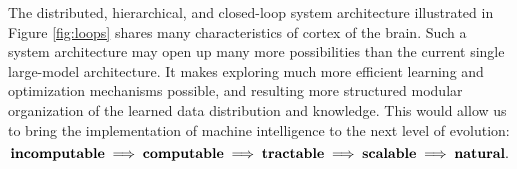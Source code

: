 \documentclass[\toplevelprefix/book-main.tex]{subfiles}
\begin{document}
The distributed, hierarchical, and closed-loop system architecture illustrated in Figure \ref{fig:loops} shares many characteristics of cortex of the brain. Such a system architecture may open up many more possibilities than the current single large-model architecture. It makes exploring much more efficient learning and optimization mechanisms possible, and resulting more structured modular organization of the learned data distribution and knowledge. This would allow us to bring the implementation of machine intelligence to the next level of evolution: 
\begin{equation}
   \mbox{\textbf{incomputable}} \;
   \Longrightarrow \; \mbox{\textbf{computable}} \;
   \Longrightarrow \; \mbox{\textbf{tractable}} \; \Longrightarrow \; 
   \mbox{\textbf{scalable}} \; \Longrightarrow \; 
   \mbox{\textbf{natural}}.
\end{equation}
\end{document}

